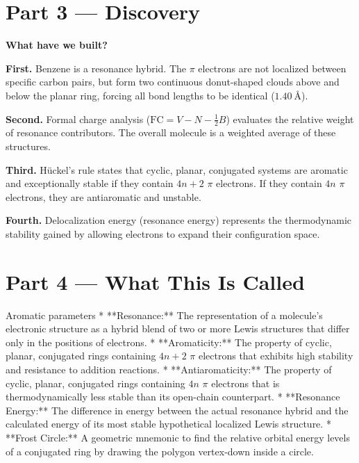 \documentclass[12pt, a4paper]{book}
\begin{document}
\newpage

\section{Part 3 --- Discovery}

\begin{discoverybox}
\textbf{What have we built?}

\textbf{First.} Benzene is a resonance hybrid. The $\pi$ electrons are not localized between specific carbon pairs, but form two continuous donut-shaped clouds above and below the planar ring, forcing all bond lengths to be identical ($\SI{1.40}{\text{\AA}}$).

\textbf{Second.} Formal charge analysis ($\text{FC} = V - N - \frac{1}{2}B$) evaluates the relative weight of resonance contributors. The overall molecule is a weighted average of these structures.

\textbf{Third.} Hückel's rule states that cyclic, planar, conjugated systems are aromatic and exceptionally stable if they contain $4n+2$ $\pi$ electrons. If they contain $4n$ $\pi$ electrons, they are antiaromatic and unstable.

\textbf{Fourth.} Delocalization energy (resonance energy) represents the thermodynamic stability gained by allowing electrons to expand their configuration space.
\end{discoverybox}

\newpage

\section{Part 4 --- What This Is Called}

\begin{namedconcept}{Aromatic parameters}
* **Resonance:** The representation of a molecule's electronic structure as a hybrid blend of two or more Lewis structures that differ only in the positions of electrons.
* **Aromaticity:** The property of cyclic, planar, conjugated rings containing $4n+2$ $\pi$ electrons that exhibits high stability and resistance to addition reactions.
* **Antiaromaticity:** The property of cyclic, planar, conjugated rings containing $4n$ $\pi$ electrons that is thermodynamically less stable than its open-chain counterpart.
* **Resonance Energy:** The difference in energy between the actual resonance hybrid and the calculated energy of its most stable hypothetical localized Lewis structure.
* **Frost Circle:** A geometric mnemonic to find the relative orbital energy levels of a conjugated ring by drawing the polygon vertex-down inside a circle.
\end{namedconcept}
\end{document}
